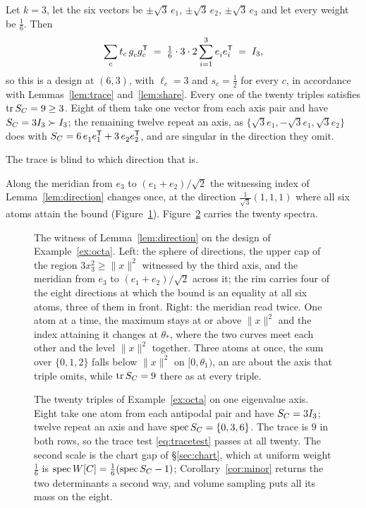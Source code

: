 \begin{example}\label{ex:octa}
Let $k=3$, let the six vectors be $\pm\sqrt3\,e_1$, $\pm\sqrt3\,e_2$,
$\pm\sqrt3\,e_3$ and let every weight be $\tfrac16$.  Then
\[
  \sum_c t_c\,g_c^{\vphantom{\mathsf{T}}}g_c\tp
  \;=\;\tfrac16\cdot3\cdot2\sum_{i=1}^{3}e_i^{\vphantom{\mathsf{T}}}e_i\tp\;=\;I_3 ,
\]
so this is a design at $(6,3)$, with $\ell_c=3$ and $s_c=\tfrac12$ for
every $c$, in accordance with Lemmas~\ref{lem:trace} and~\ref{lem:share}.
Every one of the twenty triples satisfies $\operatorname{tr}S_{C}=9\ge3$.  Eight of them
take one vector from each axis pair and have $S_{C}=3I_3\succ I_3$; the
remaining twelve repeat an axis, as $\{\sqrt3e_1,-\sqrt3e_1,\sqrt3e_2\}$
does with
$\SC=6\,e_1^{\vphantom{\mathsf{T}}}e_1\tp+3\,e_2^{\vphantom{\mathsf{T}}}e_2\tp$,
and are singular in the direction they omit.

The trace is blind to which direction that is.

Along the meridian from $e_3$ to $(e_1+e_2)/\sqrt2$ the
witnessing index of Lemma~\ref{lem:direction} changes once, at the direction
$\tfrac1{\sqrt3}(1,1,1)$ where all six atoms attain the bound
(Figure~\ref{fig:witness}).  Figure~\ref{fig:octaspec} carries the twenty
spectra.
\end{example}

\begin{figure}[ht]
  \centering
  
  \caption{The witness of Lemma~\ref{lem:direction} on the design of
  Example~\ref{ex:octa}.  Left: the sphere of directions, the upper cap of the
  region $3x_3^2\ge\lVert x\rVert^2$ witnessed by the third axis, and the meridian
  from $e_3$ to $(e_1+e_2)/\sqrt2$ across it; the rim carries four of the
  eight directions at which the bound is an equality at all six atoms, three
  of them in front.  Right: the meridian read twice.  One atom at a time, the
  maximum stays at or above $\lVert x\rVert^2$ and the index attaining it
  changes at $\theta_*$, where the two curves meet each other and the level
  $\lVert x\rVert^2$ together.  Three atoms at once, the sum over $\{0,1,2\}$
  falls below $\lVert x\rVert^2$ on $[0,\theta_1)$, an arc about the axis that
  triple omits, while $\operatorname{tr}S_{C}=9$ there as at every triple.}
  \label{fig:witness}
\end{figure}

\begin{figure}[ht]
  \centering
  
  \caption{The twenty triples of Example~\ref{ex:octa} on one eigenvalue axis.
  Eight take one atom from each antipodal pair and have $S_{C}=3I_3$; twelve
  repeat an axis and have $\operatorname{spec}S_{C}=\{0,3,6\}$.  The trace is
  $9$ in both rows, so the trace test \eqref{eq:tracetest} passes at all
  twenty.  The second scale is the chart gap of \S\ref{sec:chart}, which at
  uniform weight $\tfrac16$ is $\operatorname{spec}W[C]
  =\tfrac16(\operatorname{spec}S_{C}-1)$; Corollary~\ref{cor:minor} returns the
  two determinants a second way, and volume sampling puts all its mass on the
  eight.}
  \label{fig:octaspec}
\end{figure}

